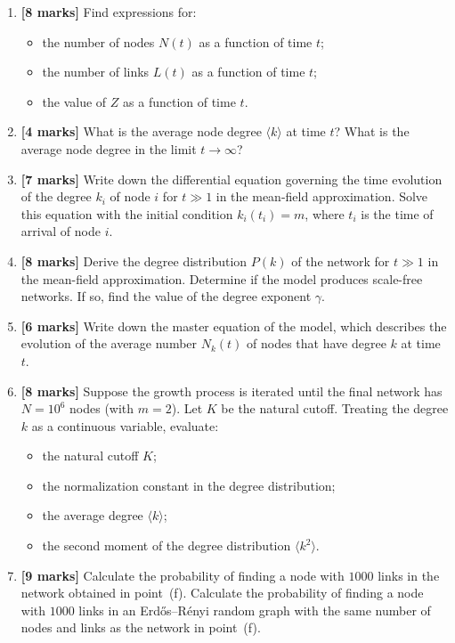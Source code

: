 \documentclass[11pt,a4paper]{article}
\begin{document}
\begin{enumerate}[label=\textbf{(\alph*)}, leftmargin=*, itemsep=1.1em]

\item \textbf{[8 marks]}
Find expressions for:
\begin{itemize}[nosep]
  \item the number of nodes $N(t)$ as a function of time $t$;
  \item the number of links $L(t)$ as a function of time $t$;
  \item the value of $Z$ as a function of time $t$.
\end{itemize}

\item \textbf{[4 marks]}
What is the average node degree $\langle k \rangle$ at time $t$? What is the average node degree in the limit $t \to \infty$?

\item \textbf{[7 marks]}
Write down the differential equation governing the time evolution of the degree $k_i$ of node $i$ for $t \gg 1$ in the mean-field approximation. Solve this equation with the initial condition $k_i(t_i) = m$, where $t_i$ is the time of arrival of node $i$.

\item \textbf{[8 marks]}
Derive the degree distribution $P(k)$ of the network for $t \gg 1$ in the mean-field approximation. Determine if the model produces scale-free networks. If so, find the value of the degree exponent $\gamma$.

\item \textbf{[6 marks]}
Write down the master equation of the model, which describes the evolution of the average number $N_k(t)$ of nodes that have degree $k$ at time $t$.

\item \textbf{[8 marks]}
Suppose the growth process is iterated until the final network has $N = 10^6$ nodes (with $m = 2$). Let $K$ be the natural cutoff. Treating the degree $k$ as a continuous variable, evaluate:
\begin{itemize}[nosep]
  \item the natural cutoff $K$;
  \item the normalization constant in the degree distribution;
  \item the average degree $\langle k \rangle$;
  \item the second moment of the degree distribution $\langle k^2 \rangle$.
\end{itemize}

\item \textbf{[9 marks]}
Calculate the probability of finding a node with $1000$ links in the network obtained in point~(f). Calculate the probability of finding a node with $1000$ links in an Erd\H{o}s--R\'enyi random graph with the same number of nodes and links as the network in point~(f).

\end{enumerate}
\end{document}
